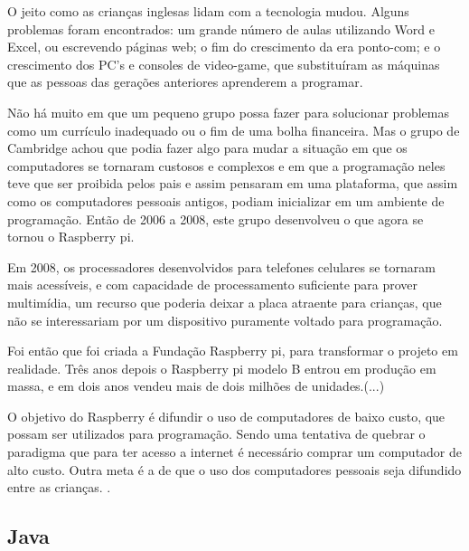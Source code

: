 	O jeito como as crianças inglesas lidam com a tecnologia mudou. Alguns problemas foram encontrados: um grande número de aulas utilizando Word e Excel, ou escrevendo páginas web; o fim do crescimento da era ponto-com; e o crescimento dos PC’s e consoles de video-game, que substituíram as máquinas que as pessoas das gerações anteriores aprenderem a programar.\par
	Não há muito em que um pequeno grupo possa fazer para solucionar problemas como um currículo inadequado ou o fim de uma bolha financeira. Mas o grupo de Cambridge achou que podia fazer algo para mudar a situação em que os computadores se tornaram custosos e complexos e em que a programação neles teve que ser proibida pelos pais e assim pensaram em uma plataforma, que assim como os computadores pessoais antigos, podiam inicializar em um ambiente de programação. Então de 2006 a 2008, este grupo desenvolveu o que agora se tornou o Raspberry pi.\par
	Em 2008, os processadores desenvolvidos para telefones celulares se tornaram mais
	acessíveis, e com capacidade de processamento suficiente para prover multimídia, um
	recurso que poderia deixar a placa atraente para crianças, que não se interessariam por um dispositivo puramente voltado para programação.\par
	Foi então que foi criada a Fundação Raspberry pi, para transformar o projeto em
	realidade. Três anos depois o Raspberry pi modelo B entrou em produção em massa, e
	em dois anos vendeu mais de dois milhões de unidades.(...)\par
	
	O objetivo do Raspberry é difundir o uso de computadores de baixo custo, que
	possam ser utilizados para programação. Sendo uma tentativa de quebrar o paradigma que
	para ter acesso a internet é necessário comprar um computador de alto custo. Outra meta é a de que o uso dos computadores pessoais seja difundido entre as crianças. \cite{raspberry}.\par


	\subsection{Java}\label{subsec-java}
	
